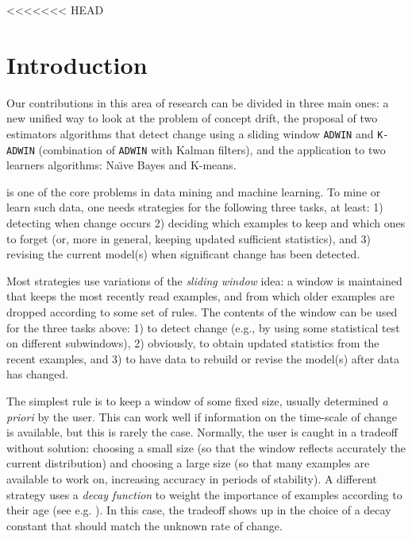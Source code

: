<<<<<<< HEAD
\section{Introduction}
\label{Introduction}

 Our contributions in this area of research %
 can be divided in three main ones: a new unified way to look at the problem of concept drift, the proposal of 
two estimators algorithms that detect change using a sliding 
window {\tt ADWIN} and {\tt K-ADWIN} (combination of {\tt ADWIN} with Kalman filters),
and the application to two learners algorithms: Na\"{\i}ve Bayes and K-means.



\BEGINOMIT
is one of the core problems in data mining and machine learning.
To mine or learn such data, one needs strategies for
the following three tasks, at least: 1) detecting when
change occurs 2) deciding which examples to keep and which ones
to forget (or, more in general, keeping updated sufficient statistics),
and 3) revising the current model(s) when significant  
change has been detected.

Most strategies use variations of the {\em sliding window} idea:
a window is maintained that keeps the most recently read examples,
and from which older examples are dropped according to some
set of rules. The contents of the window can be used for the
three tasks above: 1) to detect change (e.g., by using some statistical
test on different subwindows), 2) obviously, to
obtain updated statistics from the recent examples,
and 3) to have data to rebuild or revise the model(s) after data has 
changed.

The simplest rule is to keep a window
of some fixed size, usually determined {\em a priori} by the user.
This can work well if information on the time-scale
of change is available, but this is rarely the case.
Normally, the user is caught in a tradeoff without solution:
choosing a small size (so that the window reflects accurately the current distribution)
and choosing a large size (so that many examples are available to work on, 
increasing accuracy in periods of stability).
A different strategy uses a {\em decay function}
to weight the importance of examples according to their
age (see e.g. \cite{CS03}). %
In this case, the tradeoff shows up in the 
choice of a decay constant that should match the unknown rate of change.

